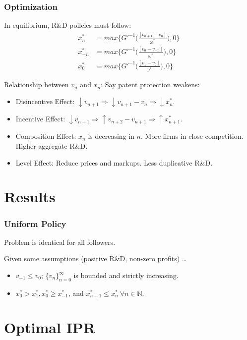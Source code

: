\documentclass{beamer}
\begin{document}
\begin{frame}[t]\frametitle{Optimization} 
  In equilibrium, R\&D poilcies must follow:
  \begin{align*} \label{eq:ss_rd_policies}
    x_n^*    &= max \big\{G'^{-1}\Bigg(\frac{[v_{n+1} - v_n]}{\omega^*}\Bigg)   ,0\}\\
    x_{-n}^* &= max \big\{G'^{-1}\Bigg(\frac{[v_0  - v_{-n}]}{\omega^*}\Bigg)   ,0\}\\
    x_0^*    &= max \big\{G'^{-1}\Bigg(\frac{[v_1     - v_0]}{\omega^*}\Bigg)   ,0\}
  \end{align*}

  Relationship between $v_n$ and $x_n$: Say patent protection weakens:
  \begin{itemize}
    \item<+-> Disincentive Effect: $\downarrow v_{n+1} \Rightarrow \downarrow v_{n+1} - v_n \Rightarrow \downarrow x_n^*$.
    \item<+-> Incentive Effect: $\downarrow v_{n+1} \Rightarrow \uparrow v_{n+2} - v_{n+1} \Rightarrow \uparrow x_{n+1}^*$.
    \item<+-> Composition Effect: $x_n$ is decreasing in $n$. More firms in close competition. Higher aggregate R\&D.
    \item<+-> Level Effect: Reduce prices and markups.  Less duplicative R\&D.
  \end{itemize}
\end{frame}

\section{Results}
\label{sec:results}
\begin{frame}[t]\frametitle{Uniform Policy} 
Problem is identical for all followers.

Given some assumptions (positive R\&D, non-zero profits) \ldots
\begin{itemize}
  \item<+-> $v_{-1} \leq v_0$; $\{v_n\}_{n=0}^{\infty}$ is bounded and strictly increasing.
  \item<+-> $x_0^* > x_1^*, x_0^* \geq x_{-1}^*$, and $x_{n+1}^* \leq x_n^*\ \forall n \in \mathbb{N}$.
\end{itemize}
\end{frame}

\section{Optimal IPR}
\label{sec:optimal_ipr}
\end{document}

